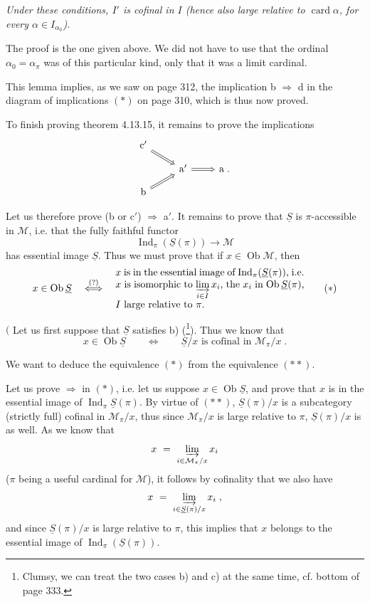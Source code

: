 \documentclass[11pt]{article}
\newcommand{\printedpage}[1]{\marginpar{\footnotesize p.~#1}}
\newcommand{\msp}[1]{\marginpar{\footnotesize [#1]}}
\DeclareMathOperator{\card}{card}
\DeclareMathOperator{\Ob}{Ob}
\DeclareMathOperator{\Ind}{Ind}
\begin{document}
\textit{Under these conditions, $I'$ is cofinal in $I$ (hence also large relative to $\card\alpha$, for every $\alpha \in I_{\alpha_0}$).}

The proof is the one given above. We did not have to use that the ordinal $\alpha_0 = \alpha_\pi$ was of this particular kind, only that it was a limit cardinal.

\printedpage{125}

\msp{page 331}

This lemma implies, as we saw on page 312, the implication b $\Longrightarrow$ d in the diagram of implications $(*)$ on page 310, which is thus now proved.

To finish proving theorem 4.13.15, it remains to prove the implications
\[
\begin{tikzcd}[row sep=small]
\mathrm{c}' \arrow[dr, Rightarrow] & & \\
& \mathrm{a}' \arrow[r, Rightarrow] & \mathrm{a} \; . \\
\mathrm{b} \arrow[ur, Rightarrow] & &
\end{tikzcd}
\]

Let us therefore prove (b or c$'$) $\Longrightarrow$ a$'$. It remains to prove that $\underline{S}$ is $\pi$-accessible in $\mathcal{M}$, i.e. that the fully faithful functor
\[
\Ind_\pi(\underline{S}(\pi)) \longrightarrow \mathcal{M} \tag*{$(*)$}
\]
has essential image $\underline{S}$. Thus we must prove that if $x \in \Ob\mathcal{M}$, then
\[
x \in \Ob\underline{S} \quad \overset{(?)}{\Longleftrightarrow} \quad
\begin{minipage}[c]{0.55\textwidth}
$x$ is in the essential image of $\Ind_\pi(\underline{S}(\pi))$, i.e. $x$ is isomorphic to $\varinjlim\limits_{i\in I} x_i$, the $x_i$ in $\Ob\underline{S}(\pi)$, $I$ large relative to $\pi$.
\end{minipage}
\tag*{$(*)$}
\]

\msp{page 332}

$\Bigg($ Let us first suppose that $\underline{S}$ satisfies b) (\footnote[141]{Clumsy, we can treat the two cases b) and c) at the same time, cf. bottom of page 333.}). Thus we know that
\[
x \in \Ob\underline{S} \qquad \Longleftrightarrow \qquad \underline{S}/x \text{ is cofinal in } \mathcal{M}_\pi/x \; . \tag*{$(**)$}
\]

We want to deduce the equivalence $(*)$ from the equivalence $(**)$.

Let us prove $\Longrightarrow$ in $(*)$, i.e. let us suppose $x \in \Ob\underline{S}$, and prove that $x$ is in the essential image of $\Ind_\pi\underline{S}(\pi)$. By virtue of $(**)$, $\underline{S}(\pi)/x$ is a subcategory (strictly full) cofinal in $\mathcal{M}_\pi/x$, thus since $\mathcal{M}_\pi/x$ is large relative to $\pi$, $\underline{S}(\pi)/x$ is as well. As we know that
\[
x \ = \ \varinjlim_{i\in\mathcal{M}_\pi/x} x_i
\]
($\pi$ being a useful cardinal for $\mathcal{M}$), it follows by cofinality that we also have
\[
x \ = \ \varinjlim_{i\in\underline{S}(\pi)/x} x_i \; ,
\]
and since $\underline{S}(\pi)/x$ is large relative to $\pi$, this implies that $x$ belongs to the essential image of $\Ind_\pi(\underline{S}(\pi))$.
\end{document}

